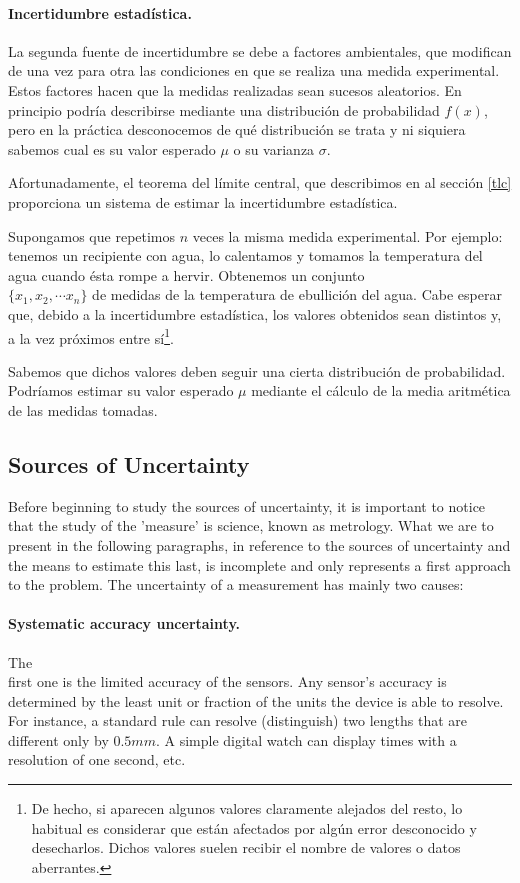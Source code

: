 \begin{paracol}{2}
\paragraph{Incertidumbre estadística.} La segunda fuente de incertidumbre se debe a factores ambientales, que modifican de una vez para otra las condiciones en que se realiza una medida experimental. Estos factores hacen que la medidas realizadas sean sucesos aleatorios. En principio podría describirse mediante una distribución de probabilidad $f(x)$, pero en la práctica desconocemos de qué distribución se trata y ni siquiera sabemos cual es su valor esperado $\mu$ o su varianza $\sigma$. 

Afortunadamente, el teorema del límite central, que describimos en al sección \ref{tlc} proporciona un sistema de estimar la incertidumbre estadística.

Supongamos que repetimos $n$ veces la misma medida experimental. Por ejemplo: tenemos un recipiente con agua, lo calentamos y tomamos la temperatura del agua cuando ésta rompe a hervir. Obtenemos un conjunto\\ $\{x_1,x_2,\cdots x_n \}$ de medidas de la temperatura de ebullición del agua. Cabe esperar que, debido a la incertidumbre estadística, los valores obtenidos sean distintos  y, a la vez próximos entre sí\footnote{De hecho, si aparecen algunos valores claramente alejados del resto, lo habitual es considerar que están afectados por algún error desconocido y desecharlos. Dichos valores suelen recibir el nombre de valores o datos aberrantes.}.

Sabemos que dichos valores deben seguir una cierta distribución de probabilidad. Podría\-mos estimar su valor esperado $\mu$ mediante el cálculo de la media aritmética de las medidas tomadas.
\switchcolumn
\subsection{Sources of Uncertainty}
Before beginning to study the sources of uncertainty, it is important to notice that the study of the 'measure' is science, known as metrology. What we are to present in the following paragraphs, in reference to the sources of uncertainty and the means to estimate this last, is incomplete and only represents a first approach to the problem. The uncertainty of a measurement has mainly two causes:

\paragraph{Systematic accuracy uncertainty.}
The\\ first one is the limited accuracy of the sensors. Any sensor's accuracy is determined by the least unit or fraction of the units the device is able to resolve. For instance, a standard rule can resolve (distinguish) two lengths that are different only by $0.5mm$. A simple digital watch can display times with a resolution of one second, etc.


\end{paracol}
